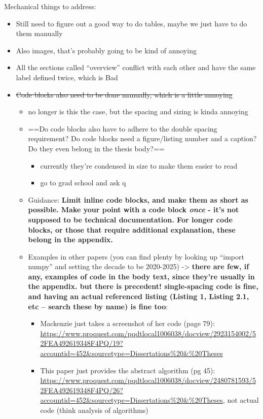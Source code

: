 Mechanical things to address:

\begin{itemize}
\tightlist
\item
  Still need to figure out a good way to do tables, maybe we just have
  to do them manually
\item
  Also images, that's probably going to be kind of annoying
\item
  All the sections called ``overview'' conflict with each other and have
  the same label defined twice, which is Bad
\item
  \st{Code blocks also need to be done manually, which is a little
  annoying}

  \begin{itemize}
  \tightlist
  \item
    no longer is this the case, but the spacing and sizing is kinda
    annoying
  \item
    ==Do code blocks also have to adhere to the double spacing
    requirement? Do code blocks need a figure/listing number and a
    caption? Do they even belong in the thesis body?==

    \begin{itemize}
    \tightlist
    \item
      currently they're condensed in size to make them easier to read
    \item
      go to grad school and ask q
    \end{itemize}
  \item
    Guidance: \textbf{Limit inline code blocks, and make them as short
    as possible. Make your point with a code block \emph{once} - it's
    not supposed to be technical documentation. For longer code blocks,
    or those that require additional explanation, these belong in the
    appendix.}
  \item
    Examples in other papers (you can find plenty by looking up ``import
    numpy'' and setting the decade to be 2020-2025) -\textgreater{}
    \textbf{there are few, if any, examples of code in the body text,
    since they're usually in the appendix. but there is precedent!
    single-spacing code is fine, and having an actual referenced listing
    (Listing 1, Listing 2.1, etc -- search these by name) is fine too}:

    \begin{itemize}
    \tightlist
    \item
      Mackenzie just takes a screenshot of her code (page 79):
      \url{https://www.proquest.com/pqdtlocal1006038/docview/2923154002/52FEA492619348F4PQ/19?accountid=452&sourcetype=Dissertations\%20&\%20Theses}
    \item
      This paper just provides the abstract algorithm (pg 45):
      \url{https://www.proquest.com/pqdtlocal1006038/docview/2480781593/52FEA492619348F4PQ/26?accountid=452&sourcetype=Dissertations\%20&\%20Theses,}
      not actual code (think analysis of algorithms)


\end{itemize}
\end{itemize}
\end{itemize}
